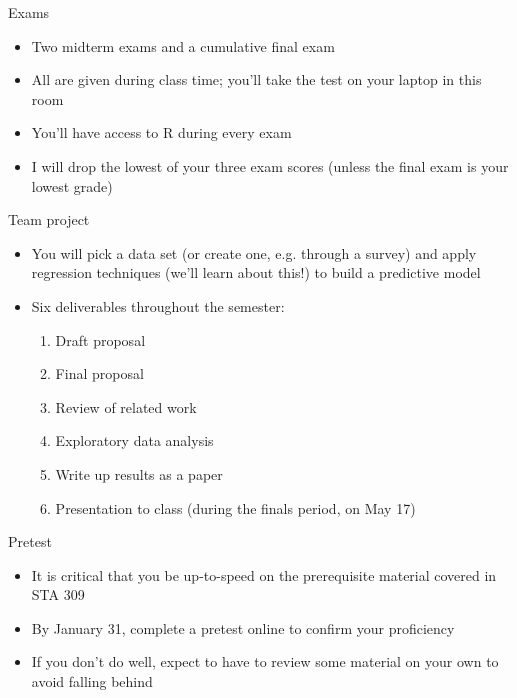 \documentclass{beamer}\usepackage[]{graphicx}\usepackage[]{color}
\begin{document}
\begin{darkframes}
    \begin{frame}{Exams}
      \begin{itemize}
        \item Two midterm exams and a cumulative final exam
        \item All are given during class time; you'll take the test on your laptop in this room
        \item You'll have access to R during every exam
        \item I will drop the lowest of your three exam scores (unless the final exam is your lowest grade)
      \end{itemize}
    \end{frame}

    \begin{frame}{Team project}
      \begin{itemize}
        \item You will pick a data set (or create one, e.g. through a survey) and apply regression techniques (we'll learn about this!) to build a predictive model
        \item Six deliverables throughout the semester:
        \begin{enumerate}
        \item Draft proposal
        \item Final proposal
        \item Review of related work
        \item Exploratory data analysis
        \item Write up results as a paper
        \item Presentation to class (during the finals period, on May 17)
        \end{enumerate}
      \end{itemize}
    \end{frame}

    \begin{frame}{Pretest}
      \begin{itemize}
        \item It is critical that you be up-to-speed on the prerequisite material covered in STA 309
        \item By January 31, complete a \alert{pretest} online to confirm your proficiency
        \item If you don't do well, expect to have to review some material on your own to avoid falling behind
      \end{itemize}
    \end{frame}


\end{darkframes}
\end{document}
